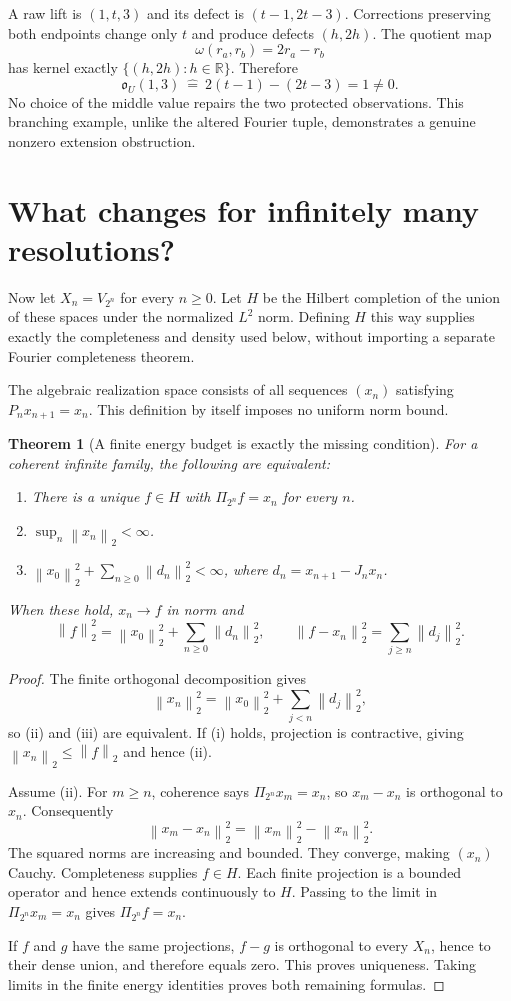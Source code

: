 \documentclass[11pt]{article}
\newtheorem{theorem}{Theorem}[section]
\theoremstyle{definition}
\theoremstyle{remark}
\newcommand{\R}{\mathbb R}
\newcommand{\norm}[1]{\left\lVert #1\right\rVert}
\begin{document}
A raw lift is $(1,t,3)$ and its defect is $(t-1,2t-3)$. Corrections preserving both endpoints change only $t$ and produce defects $(h,2h)$. The quotient map
\[
 \omega(r_a,r_b)=2r_a-r_b
\]
has kernel exactly $\{(h,2h):h\in\R\}$. Therefore
\[
 \mathfrak o_U(1,3)\ \widehat{=}\ 2(t-1)-(2t-3)=1\neq0.
\]
No choice of the middle value repairs the two protected observations. This branching example, unlike the altered Fourier tuple, demonstrates a genuine nonzero extension obstruction.

\section{What changes for infinitely many resolutions?}
\label{sec:infinite}
Now let $X_n=V_{2^n}$ for every $n\geq0$. Let $H$ be the Hilbert completion of the union of these spaces under the normalized $L^2$ norm. Defining $H$ this way supplies exactly the completeness and density used below, without importing a separate Fourier completeness theorem.

The algebraic realization space consists of all sequences $(x_n)$ satisfying $P_nx_{n+1}=x_n$. This definition by itself imposes no uniform norm bound.

\begin{theorem}[A finite energy budget is exactly the missing condition]
For a coherent infinite family, the following are equivalent:
\begin{enumerate}[label=(\roman*)]
\item There is a unique $f\in H$ with $\Pi_{2^n}f=x_n$ for every $n$.
\item $\sup_n\norm{x_n}_2<\infty$.
\item $\norm{x_0}_2^2+\sum_{n\geq0}\norm{d_n}_2^2<\infty$, where $d_n=x_{n+1}-J_nx_n$.
\end{enumerate}
When these hold, $x_n\to f$ in norm and
\[
 \norm{f}_2^2=\norm{x_0}_2^2+\sum_{n\geq0}\norm{d_n}_2^2,
 \qquad
 \norm{f-x_n}_2^2=\sum_{j\geq n}\norm{d_j}_2^2.
\]
\end{theorem}
\begin{proof}
The finite orthogonal decomposition gives
\[
 \norm{x_n}_2^2=\norm{x_0}_2^2+\sum_{j<n}\norm{d_j}_2^2,
\]
so (ii) and (iii) are equivalent. If (i) holds, projection is contractive, giving $\norm{x_n}_2\leq\norm{f}_2$ and hence (ii).

Assume (ii). For $m\geq n$, coherence says $\Pi_{2^n}x_m=x_n$, so $x_m-x_n$ is orthogonal to $x_n$. Consequently
\[
 \norm{x_m-x_n}_2^2=\norm{x_m}_2^2-\norm{x_n}_2^2.
\]
The squared norms are increasing and bounded. They converge, making $(x_n)$ Cauchy. Completeness supplies $f\in H$. Each finite projection is a bounded operator and hence extends continuously to $H$. Passing to the limit in $\Pi_{2^n}x_m=x_n$ gives $\Pi_{2^n}f=x_n$.

If $f$ and $g$ have the same projections, $f-g$ is orthogonal to every $X_n$, hence to their dense union, and therefore equals zero. This proves uniqueness. Taking limits in the finite energy identities proves both remaining formulas.
\end{proof}
\end{document}
